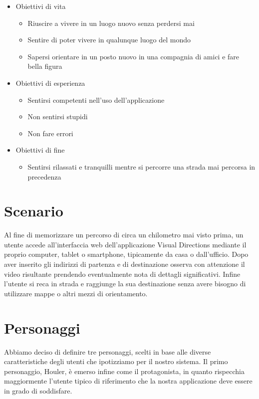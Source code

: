 \documentclass[12pt,a4paper,openright, notitlepage]{report}
\begin{document}
\begin{itemize}
\item Obiettivi di vita
	\begin{itemize}
		\item Riuscire a vivere in un luogo nuovo senza perdersi mai
		\item Sentire di poter vivere in qualunque luogo del mondo
		\item Sapersi orientare in un posto nuovo in una compagnia di amici e fare bella figura
	\end{itemize}
\item Obiettivi di esperienza
	\begin{itemize}
		\item Sentirsi competenti nell’uso dell’applicazione
		\item Non sentirsi stupidi
		\item Non fare errori
	\end{itemize}
\item Obiettivi di fine
	\begin{itemize}
		\item Sentirsi rilassati e tranquilli mentre si percorre una strada mai percorsa in precedenza
	\end{itemize}
\end{itemize}

\section{Scenario}

Al fine di memorizzare un percorso di circa un chilometro mai visto prima, un utente accede all’interfaccia web dell’applicazione Visual Directions mediante il proprio computer, tablet o smartphone, tipicamente da casa o dall’ufficio. Dopo aver inserito gli indirizzi di partenza e di destinazione osserva con attenzione il video risultante prendendo eventualmente nota di dettagli significativi. Infine l’utente si reca in strada e raggiunge la sua destinazione senza avere bisogno di utilizzare mappe o altri mezzi di orientamento.

\section{Personaggi}

Abbiamo deciso di definire tre personaggi, scelti in base alle diverse caratteristiche degli utenti che ipotizziamo per il nostro sistema. Il primo personaggio, Houler, è emerso infine come il protagonista, in quanto rispecchia maggiormente l’utente tipico di riferimento che la nostra applicazione deve essere in grado di soddisfare.
\end{document}
